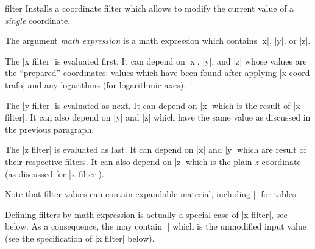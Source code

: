\begin{pgfplotsxyexpressionkeylist}{\x\space filter}
    Installs a coordinate filter which allows to modify the current value of a
    \emph{single} coordinate.

    The argument \emph{math expression} is a math expression which contains
    |x|, |y|, or |z|.
\begin{codeexample}[]
\end{codeexample}

    The |x filter| is evaluated first. It can depend on |x|, |y|, and |z| whose
    values are the ``prepared'' coordinates: values which have been found after
    applying |x coord trafo| and any logarithms (for logarithmic axes).

    The |y filter| is evaluated as next. It can depend on |x| which is the
    result of |x filter|. It can also depend on |y| and |z| which have the same
    value as discussed in the previous paragraph.

    The |z filter| is evaluated as last. It can depend on |x| and |y| which are
    result of their respective filters. It can also depend on |z| which is the
    plain $z$-coordinate (as discussed for |x filter|).

    Note that filter values can contain expandable material, including
    |\thisrow| for tables:
\begin{codeexample}[]
\end{codeexample}
    Defining filters by math expression is actually a special case of
    |x filter|, see below. As a consequence, the  may contain
    |\pgfmathresult| which is the unmodified input value (see the specification
    of |x filter| below).
\end{pgfplotsxyexpressionkeylist}

